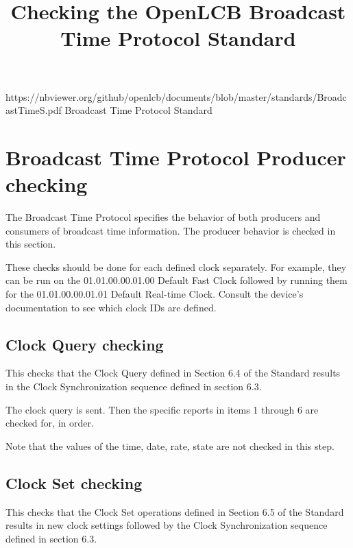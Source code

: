 

\title{Checking the OpenLCB Broadcast Time Protocol Standard}


\maketitle


\introductionCaveats
    {https://nbviewer.org/github/openlcb/documents/blob/master/standards/BroadcastTimeS.pdf}
    {Broadcast Time Protocol Standard}

\section{Broadcast Time Protocol Producer checking}

The Broadcast Time Protocol specifies the behavior of both producers and consumers of 
broadcast time information.  
The producer behavior is checked in this section.

These checks should be done for each defined clock separately. 
For example, they can be run on the 01.01.00.00.01.00 Default Fast Clock
followed by running them for the 01.01.00.00.01.01 Default Real-time Clock.
Consult the device's documentation to see which clock IDs are defined.


\subsection{Clock Query checking}

This checks that the Clock Query defined in Section 6.4 of the Standard results in the
Clock Synchronization sequence defined in section 6.3.

The clock query is sent. 
Then the specific reports in items 1 through 6 are checked for, in order.

Note that the values of the time, date, rate, state are not checked in this step.

\subsection{Clock Set checking}

This checks that the Clock Set operations defined in Section 6.5 of the Standard results 
in new clock settings followed by the
Clock Synchronization sequence defined in section 6.3.

